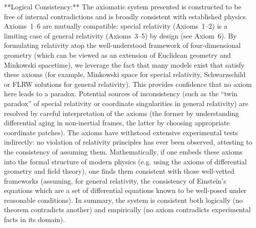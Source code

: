 \documentclass{article}
\begin{document}
**Logical Consistency:** The axiomatic system presented is constructed to be free of internal contradictions and is broadly consistent with established physics. Axioms 1–6 are mutually compatible: special relativity (Axioms 1–2) is a limiting case of general relativity (Axioms 3–5) by design (see Axiom 6). By formulating relativity atop the well-understood framework of four-dimensional geometry (which can be viewed as an extension of Euclidean geometry and Minkowski spacetime), we leverage the fact that many models exist that satisfy these axioms (for example, Minkowski space for special relativity, Schwarzschild or FLRW solutions for general relativity). This provides confidence that no axiom here leads to a paradox. Potential sources of inconsistency (such as the “twin paradox” of special relativity or coordinate singularities in general relativity) are resolved by careful interpretation of the axioms (the former by understanding differential aging in non-inertial frames, the latter by choosing appropriate coordinate patches). The axioms have withstood extensive experimental tests indirectly: no violation of relativity principles has ever been observed, attesting to the consistency of assuming them. Mathematically, if one embeds these axioms into the formal structure of modern physics (e.g. using the axioms of differential geometry and field theory), one finds them consistent with those well-vetted frameworks (assuming, for general relativity, the consistency of Einstein’s equations which are a set of differential equations known to be well-posed under reasonable conditions). In summary, the system is consistent both logically (no theorem contradicts another) and empirically (no axiom contradicts experimental facts in its domain).
\end{document}
